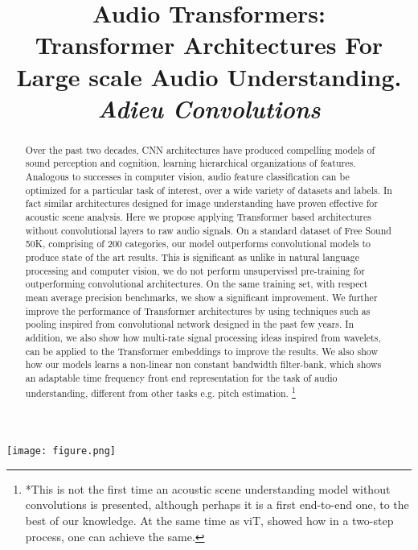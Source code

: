\documentclass{article}
\title{Audio Transformers:
\\ Transformer Architectures For Large scale Audio Understanding. \\
\textit{Adieu Convolutions}}
\begin{document}
\ninept

\maketitle
\begin{sloppy}
\begin{strip}\centering
\texttt{[image: figure.png]}
\end{strip}

\begin{abstract}
Over the past two decades, CNN architectures have produced compelling models of sound perception and cognition, learning hierarchical organizations of features. Analogous to successes in computer vision, audio feature classification can be optimized for a particular task of interest, over a wide variety of datasets and labels. In fact similar architectures designed for image understanding have proven effective for acoustic scene analysis. Here we propose applying Transformer based architectures without convolutional layers to raw audio signals. On a standard dataset of Free Sound 50K, comprising of 200 categories, our model outperforms convolutional models to produce state of the art results. This is significant as unlike in natural language processing and computer vision, we do not perform unsupervised pre-training for outperforming convolutional architectures. On the same training set, with respect mean average precision benchmarks, we show a significant improvement. We further improve the performance of Transformer architectures by using techniques such as pooling inspired from convolutional network designed in the past few years. In addition, we also show how multi-rate signal processing ideas inspired from wavelets, can be applied to  the Transformer embeddings to improve the results. We also show how our models learns a non-linear non constant bandwidth filter-bank, which shows an adaptable time frequency front end representation for the task of  audio understanding, different from other tasks e.g. pitch estimation.
\footnote{ *This is not the first time an acoustic scene understanding model without convolutions is presented, although perhaps it is a first end-to-end one, to the best of our knowledge. At the same time as viT, \cite{verma2020framework} showed how in a two-step process, one can achieve the same.}
\end{abstract}



\end{sloppy}
\end{document}
